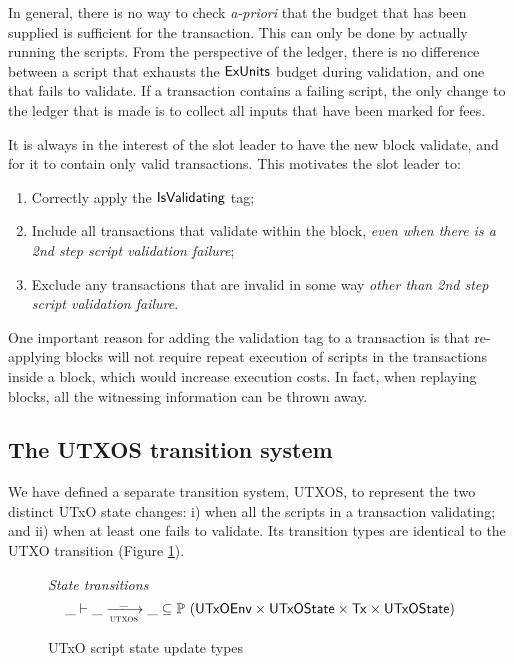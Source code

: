 In general, there is no way to check \emph{a-priori} that the budget that has been supplied is sufficient for the transaction.
This can only be done by actually running the scripts. From the perspective of the ledger, there is no difference
between a script that exhausts the $\mathsf{ExUnits}$ budget during validation, and one that fails to validate.
If a transaction contains a failing script, the only change to the ledger that is made
is to collect all inputs that have been marked for fees.

It is always in the interest of the slot leader to have the new block validate,
and for it to contain only valid transactions. This motivates the
slot leader to:

\begin{enumerate}
  \item Correctly apply the $\mathsf{IsValidating}$ tag;
  \item Include all transactions that validate within the block,
  \textit{even when there is a 2nd step script validation failure};
  \item Exclude any transactions that are invalid in some way \textit{other than 2nd step script validation failure}.
\end{enumerate}

One important reason for adding the validation tag
to a transaction is that re-applying blocks will not require repeat
execution of scripts in the transactions inside a block, which would increase execution costs.
In fact, when replaying
blocks, all the witnessing information can be thrown away.

\subsection{The UTXOS transition system}
\label{sec:utxo-state-trans}

We have defined a separate transition system, UTXOS, to represent the two distinct
UTxO state changes: i) when all the scripts in a transaction validating; and
ii) when at least one fails to validate. Its transition types
are identical to the UTXO transition (Figure
\ref{fig:ts-types:utxo-scripts}).

\begin{figure}[htb]
  \emph{State transitions}
  \begin{equation*}
    \_ \vdash
    \var{\_} \trans{utxos}{\_} \var{\_}
    \subseteq \powerset (\UTxOEnv \times \UTxOState \times \Tx \times \UTxOState)
  \end{equation*}
  \caption{UTxO script state update types}
  \label{fig:ts-types:utxo-scripts}
\end{figure}

